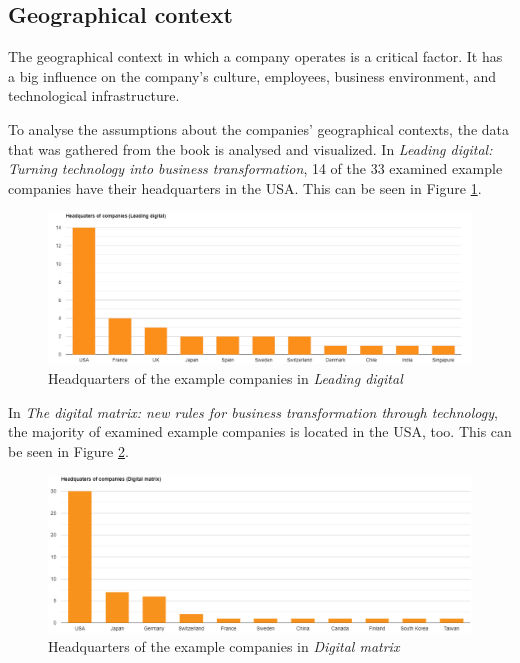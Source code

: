 \documentclass[a4]{scrartcl}
\begin{document}








\subsection{Geographical context} \label{subsec:geo_assumptions}


The geographical context in which a company operates is a critical factor. It has a big influence on the company's culture, employees, business environment, and technological infrastructure. 

To analyse the assumptions about the companies' geographical contexts, the data that was gathered from the book is analysed and visualized. In \textit{Leading digital: Turning technology into business transformation}, 14 of the 33 examined example companies have their headquarters in the USA. This can be seen in Figure \ref{fig:LD_graph}. \cite{leadingdigital}

\begin{figure}[H]
	\centering
	\includegraphics[width=1\textwidth]{images/LD_graph.png}
	\caption{Headquarters of the example companies in \textit{Leading digital} \cite{leadingdigital}}
	\label{fig:LD_graph}
\end{figure}

In \textit{The digital matrix: new rules for business transformation through technology}, the majority of examined example companies is located in the USA, too. This can be seen in Figure \ref{fig:DM_graph}.

\begin{figure}[H]
	\centering
	\includegraphics[width=1\textwidth]{images/MD_graph.png}
	\caption{Headquarters of the example companies in \textit{Digital matrix} \cite{digitalmatrix}}
	\label{fig:DM_graph}
\end{figure}
\end{document}
